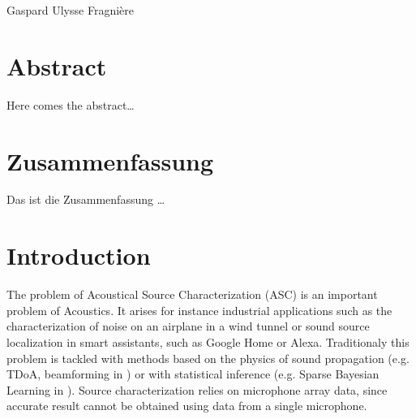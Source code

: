 \documentclass[11pt,a4paper,twoside]{report}
\begin{document}
\vspace{19mm}
\noindent
Gaspard Ulysse Fragnière \null

\cleardoublepage

\thispagestyle{empty}
\chapter*{Abstract}

Here comes the abstract\ldots

\clearpage

\thispagestyle{empty}
\german
\chapter*{Zusammenfassung}

Das ist die Zusammenfassung \ldots

\english
\cleardoublepage

\pagestyle{fancy}
\renewcommand{\chaptermark}[1]{\markboth{#1}{}}
\renewcommand{\sectionmark}[1]{\markright{\thesection\ #1}}
\fancyhead{}

\fancyhead[LO]{\scshape \contentsname}
\fancyhead[RE]{\scshape \contentsname}
\tableofcontents

\cleardoublepage

\setcounter{chapter}{0}
\setcounter{figure}{0}
\fancyhead[LO]{\rightmark}
\fancyhead[RO]{\scshape \chaptername\ \thechapter}
\fancyhead[LE]{\scshape \chaptername\ \thechapter}
\fancyhead[RE]{\textsc{\leftmark}}


\chapter{Introduction}


The problem of Acoustical Source Characterization (ASC) is an important problem  of Acoustics. It arises for instance industrial applications such as the characterization of noise on an airplane in a wind tunnel or sound source localization in smart assistants, such as Google Home or Alexa. Traditionaly this problem is tackled with methods based on the physics of sound propagation (e.g. TDoA, beamforming in \cite{merino2019review}) or with statistical inference (e.g. Sparse Bayesian Learning in \cite{gerstoft2016multisnapshot}). Source characterization relies on microphone array data, since accurate result cannot be obtained using data from a single microphone. 
\end{document}
